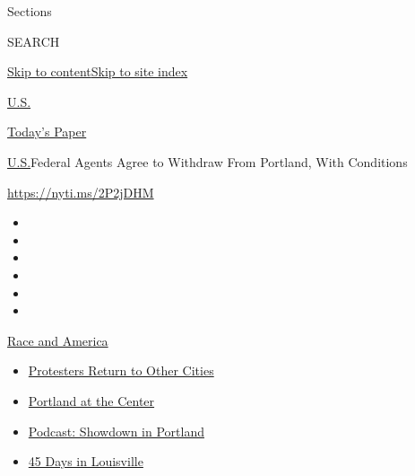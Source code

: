 Sections

SEARCH

\protect\hyperlink{site-content}{Skip to
content}\protect\hyperlink{site-index}{Skip to site index}

\href{https://www.nytimes3xbfgragh.onion/section/us}{U.S.}

\href{https://myaccount.nytimes3xbfgragh.onion/auth/login?response_type=cookie\&client_id=vi}{}

\href{https://www.nytimes3xbfgragh.onion/section/todayspaper}{Today's
Paper}

\href{/section/us}{U.S.}\textbar{}Federal Agents Agree to Withdraw From
Portland, With Conditions

\url{https://nyti.ms/2P2jDHM}

\begin{itemize}
\item
\item
\item
\item
\item
\item
\end{itemize}

\href{https://www.nytimes3xbfgragh.onion/news-event/george-floyd-protests-minneapolis-new-york-los-angeles?action=click\&pgtype=Article\&state=default\&region=TOP_BANNER\&context=storylines_menu}{Race
and America}

\begin{itemize}
\tightlist
\item
  \href{https://www.nytimes3xbfgragh.onion/2020/07/26/us/protests-portland-seattle-trump.html?action=click\&pgtype=Article\&state=default\&region=TOP_BANNER\&context=storylines_menu}{Protesters
  Return to Other Cities}
\item
  \href{https://www.nytimes3xbfgragh.onion/2020/07/24/us/portland-oregon-protests-white-race.html?action=click\&pgtype=Article\&state=default\&region=TOP_BANNER\&context=storylines_menu}{Portland
  at the Center}
\item
  \href{https://www.nytimes3xbfgragh.onion/2020/07/23/podcasts/the-daily/portland-protests.html?action=click\&pgtype=Article\&state=default\&region=TOP_BANNER\&context=storylines_menu}{Podcast:
  Showdown in Portland}
\item
  \href{https://www.nytimes3xbfgragh.onion/interactive/2020/07/16/us/black-lives-matter-protests-louisville-breonna-taylor.html?action=click\&pgtype=Article\&state=default\&region=TOP_BANNER\&context=storylines_menu}{45
  Days in Louisville}
\end{itemize}

